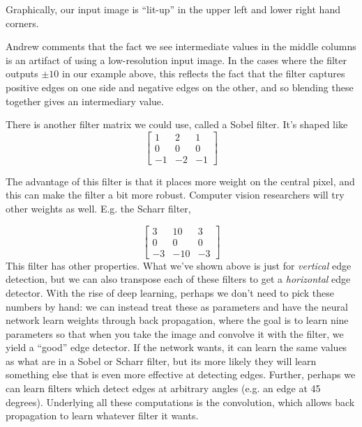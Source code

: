 \documentclass[12pt]{article}
\begin{document}
Graphically, our input image is ``lit-up'' in the upper left and lower right hand corners.
\begin{figure}[h]   \centering
   \end{figure}
Andrew comments that the fact we see intermediate values in the middle columns is an artifact of using a low-resolution
input image. In the cases where the filter outputs $\pm 10$ in our example above, this reflects the fact that the filter
captures positive edges on one side and negative edges on the other, and so blending these together gives an intermediary value.

There is another filter matrix we could use, called a Sobel filter. It's shaped like
\begin{equation*}   
  \begin{bmatrix}     1 & 2 & 1 \\ 0 & 0 & 0 \\ -1 & -2 & -1     \end{bmatrix}
\end{equation*}

The advantage of this filter is that it places more weight on the central pixel, and this can make
the filter a bit more robust. Computer vision researchers will try other weights as well. E.g. the Scharr filter,

\begin{equation*}   
  \begin{bmatrix}     3 & 10 & 3 \\ 0 & 0 & 0 \\ -3 & -10 & -3     \end{bmatrix}
\end{equation*}
This filter has other properties. What we've shown above is just for \emph{vertical} edge detection,
but we can also transpose each of these filters to get a \emph{horizontal} edge detector.
With the rise of deep learning, perhaps we don't need to pick these numbers by hand: we can instead treat these
as parameters and have the neural network learn weights through back propagation, where the goal is to learn nine
parameters so that when you take the image and convolve it with the filter, we yield a ``good'' edge detector.
If the network wants, it can learn the same values as what are in a Sobel or Scharr filter, but its more likely they
will learn something else that is even more effective at detecting edges. Further, perhaps we can learn filters which
detect edges at arbitrary angles (e.g. an edge at 45 degrees). Underlying all these computations is the convolution,
which allows back propagation to learn whatever filter it wants.
\end{document}
